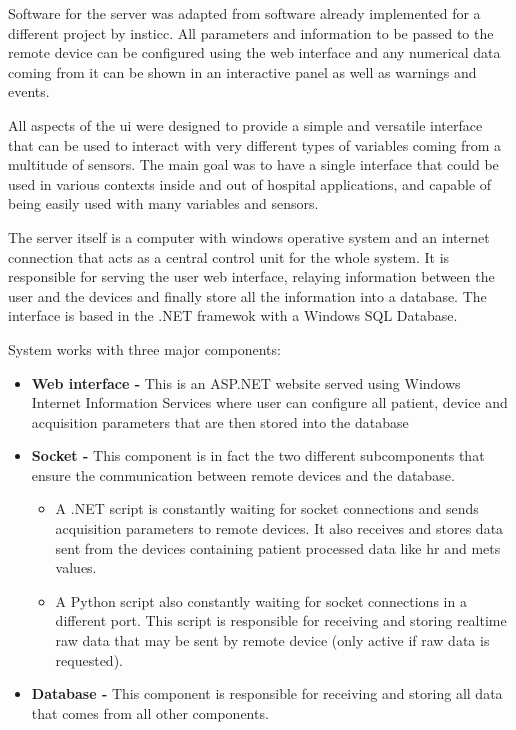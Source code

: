 Software for the server was adapted from software already implemented  for a different project \cite{telemold} by \ac{insticc}. All parameters and information to be passed to the remote device can be configured using the web interface and any numerical data coming from it can be shown in an interactive panel as well as warnings and events.

All aspects of the \ac{ui} were designed to provide a simple and versatile interface that can be used to interact with very different types of variables coming from a multitude of sensors. The main goal was to have a single interface that could be used in various contexts inside and out of hospital applications, and capable of being easily used with many variables and sensors.

The server itself is a computer with windows operative system and an internet connection that acts as a central control unit for the whole system. It is responsible for serving the user web interface, relaying information between the user and the devices and finally store all the information into a database. The interface is based in the .NET framewok with a Windows SQL Database.

System works with three major components:

\begin{itemize}
	\item \textbf{Web interface -} This is an ASP.NET website served using Windows Internet Information Services where user can configure all patient, device and acquisition parameters that are then stored into the database
	\item \textbf{Socket -} This component is in fact the two different subcomponents that ensure the communication between remote devices and the database.
	\begin{itemize}
		\item A .NET script is constantly waiting for socket connections and sends acquisition parameters to remote devices. It also receives and stores data sent from the devices containing patient processed data like \ac{hr} and \ac{mets} values.
		\item A Python script also constantly waiting for socket connections in a different port. This script is responsible for receiving and storing realtime raw data that may be sent by remote device (only active if raw data is requested).
	\end{itemize}
	\item \textbf{Database -} This component is responsible for receiving and storing all data that comes from all other components.
\end{itemize}

